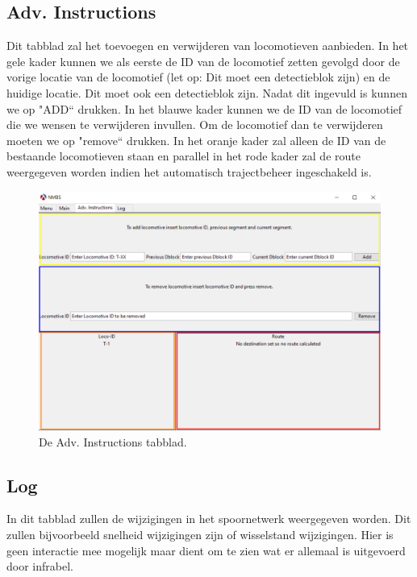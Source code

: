 \documentclass{article}
\begin{document}
\subsection{Adv. Instructions}
Dit tabblad zal het toevoegen en verwijderen van locomotieven aanbieden. In het gele kader kunnen we als eerste
de ID van de locomotief zetten gevolgd door de vorige locatie van de locomotief (let op: Dit moet een detectieblok zijn) en de huidige locatie.
Dit moet ook een detectieblok zijn. Nadat dit ingevuld is kunnen we op "ADD`` drukken. In het blauwe kader kunnen we de ID van de locomotief die we wensen te verwijderen invullen. 
Om de locomotief dan te verwijderen moeten we op "remove`` drukken. In het oranje kader zal alleen de ID van de bestaande locomotieven staan en parallel in het rode kader
zal de route weergegeven worden indien het automatisch trajectbeheer ingeschakeld is.  
\begin{figure}[h]
    \centering
    \includegraphics[width=\textwidth]{Images/Screenshot_6.png}
    \caption{De Adv. Instructions tabblad.}
\end{figure}
\subsection{Log}
In dit tabblad zullen de wijzigingen in het spoornetwerk weergegeven worden. Dit zullen bijvoorbeeld snelheid wijzigingen zijn of wisselstand wijzigingen. Hier is geen
interactie mee mogelijk maar dient om te zien wat er allemaal is uitgevoerd door infrabel. 
\end{document}
